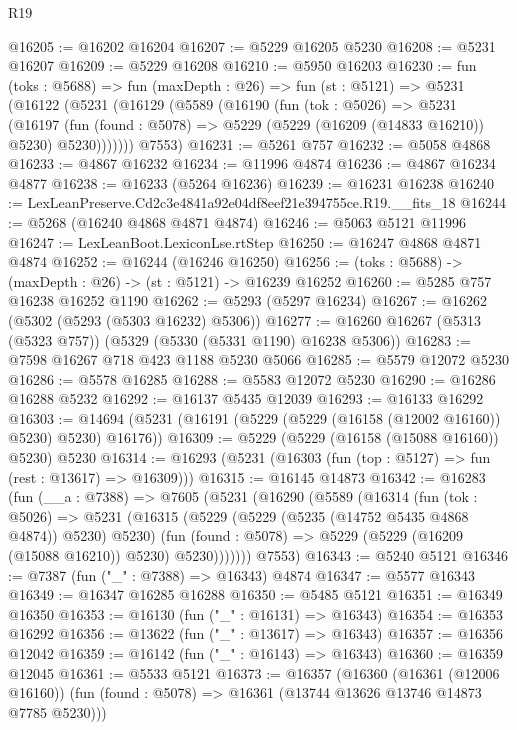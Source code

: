 \begin{lexlean}{R19}
\begin{coremodule}
@16205 := @16202 @16204
@16207 := @5229 @16205 @5230
@16208 := @5231 @16207
@16209 := @5229 @16208
@16210 := @5950 @16203
@16230 := fun (toks : @5688) =>
  fun (maxDepth : @26) =>
  fun (st : @5121) =>
  @5231
    (@16122
      (@5231
        (@16129
          (@5589
            (@16190
              (fun (tok : @5026) =>
              @5231
                (@16197
                  (fun (found : @5078) => @5229 (@5229 (@16209 (@14833 @16210)) @5230) @5230)))))))
      @7553)
@16231 := @5261 @757
@16232 := @5058 @4868
@16233 := @4867 @16232
@16234 := @11996 @4874
@16236 := @4867 @16234 @4877
@16238 := @16233 (@5264 @16236)
@16239 := @16231 @16238
@16240 := LexLeanPreserve.Cd2c3e4841a92e04df8eef21e394755ce.R19.__fits_18
@16244 := @5268 (@16240 @4868 @4871 @4874)
@16246 := @5063 @5121 @11996
@16247 := LexLeanBoot.LexiconLse.rtStep
@16250 := @16247 @4868 @4871 @4874
@16252 := @16244 (@16246 @16250)
@16256 := (toks : @5688) -> (maxDepth : @26) -> (st : @5121) -> @16239 @16252
@16260 := @5285 @757 @16238 @16252 @1190
@16262 := @5293 (@5297 @16234)
@16267 := @16262 (@5302 (@5293 (@5303 @16232) @5306))
@16277 := @16260 @16267 (@5313 (@5323 @757)) (@5329 (@5330 (@5331 @1190) @16238 @5306))
@16283 := @7598 @16267 @718 @423 @1188 @5230 @5066
@16285 := @5579 @12072 @5230
@16286 := @5578 @16285
@16288 := @5583 @12072 @5230
@16290 := @16286 @16288 @5232
@16292 := @16137 @5435 @12039
@16293 := @16133 @16292
@16303 := @14694 (@5231 (@16191 (@5229 (@5229 (@16158 (@12002 @16160)) @5230) @5230) @16176))
@16309 := @5229 (@5229 (@16158 (@15088 @16160)) @5230) @5230
@16314 := @16293 (@5231 (@16303 (fun (top : @5127) => fun (rest : @13617) => @16309)))
@16315 := @16145 @14873
@16342 := @16283
    (fun (__a : @7388) =>
    @7605
      (@5231
        (@16290
          (@5589
            (@16314
              (fun (tok : @5026) =>
              @5231
                (@16315
                  (@5229 (@5229 (@5235 (@14752 @5435 @4868 @4874)) @5230) @5230)
                  (fun (found : @5078) => @5229 (@5229 (@16209 (@15088 @16210)) @5230) @5230)))))))
      @7553)
@16343 := @5240 @5121
@16346 := @7387 (fun ("_" : @7388) => @16343) @4874
@16347 := @5577 @16343
@16349 := @16347 @16285 @16288
@16350 := @5485 @5121
@16351 := @16349 @16350
@16353 := @16130 (fun ("_" : @16131) => @16343)
@16354 := @16353 @16292
@16356 := @13622 (fun ("_" : @13617) => @16343)
@16357 := @16356 @12042
@16359 := @16142 (fun ("_" : @16143) => @16343)
@16360 := @16359 @12045
@16361 := @5533 @5121
@16373 := @16357
    (@16360
      (@16361 (@12006 @16160))
      (fun (found : @5078) => @16361 (@13744 @13626 @13746 @14873 @7785 @5230)))

\end{coremodule}
\end{lexlean}

